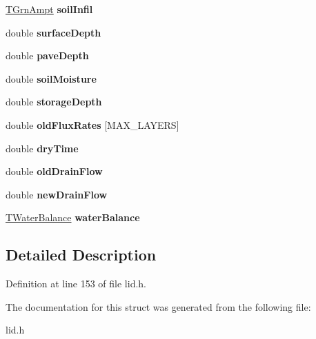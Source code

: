 \begin{DoxyCompactItemize}
\mbox{\label{struct_t_lid_unit_a47fe59e8f011ab3bb885f44c65b31e06}} 
\hyperlink{struct_t_grn_ampt}{T\+Grn\+Ampt} {\bfseries soil\+Infil}
\item 
\mbox{\label{struct_t_lid_unit_a38a871cb3e639633bba6d246e46f99f5}} 
double {\bfseries surface\+Depth}
\item 
\mbox{\label{struct_t_lid_unit_adc1d7e9117a95fc3aa29dcb95a8ccf6c}} 
double {\bfseries pave\+Depth}
\item 
\mbox{\label{struct_t_lid_unit_a4e4b5582584af8be7fc4649b281dd790}} 
double {\bfseries soil\+Moisture}
\item 
\mbox{\label{struct_t_lid_unit_a6ace8aa24549cca25854584b3c3e4065}} 
double {\bfseries storage\+Depth}
\item 
\mbox{\label{struct_t_lid_unit_a2e1ef30ad10cd9e74254e75d4f47c66f}} 
double {\bfseries old\+Flux\+Rates} \mbox{[}M\+A\+X\+\_\+\+L\+A\+Y\+E\+RS\mbox{]}
\item 
\mbox{\label{struct_t_lid_unit_af828a78570367d74c1d1343666a2a413}} 
double {\bfseries dry\+Time}
\item 
\mbox{\label{struct_t_lid_unit_a24f8dff09a2cb2fc68d10cb35fa93a29}} 
double {\bfseries old\+Drain\+Flow}
\item 
\mbox{\label{struct_t_lid_unit_afb8b4ef818385f679a9df91120b00f2b}} 
double {\bfseries new\+Drain\+Flow}
\item 
\mbox{\label{struct_t_lid_unit_aefe774e46a2e0132ef01a67ddc2d3e71}} 
\hyperlink{struct_t_water_balance}{T\+Water\+Balance} {\bfseries water\+Balance}
\end{DoxyCompactItemize}


\subsection{Detailed Description}


Definition at line 153 of file lid.\+h.



The documentation for this struct was generated from the following file\+:\begin{DoxyCompactItemize}
\item 
lid.\+h\end{DoxyCompactItemize}
